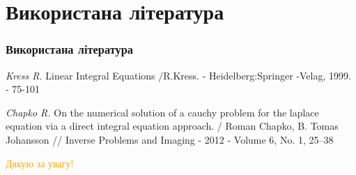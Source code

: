 \documentclass[10pt]{beamer}
\begin{document}
\section{Використана література}
\begin{frame}
\frametitle{Використана література}
\renewcommand{\bibname}{Список використаної літератури}
\begin{thebibliography}{99}

\emph{Kress R.} Linear Integral Equations /R.Kress. - Heidelberg:Springer -Velag, 1999. - 75-101

\emph{Chapko R.} On the numerical solution of a cauchy problem for the laplace equation via a direct integral equation approach. / Roman Chapko, B. Tomas Johansson // Inverse Problems and Imaging - 2012 - Volume 6, No. 1, 25–38
\end{thebibliography}

\end{frame}

\begin{frame}
\begin{center}
\Huge{\textcolor{orange}{Дякую за увагу!}}
\end{center}
\end{frame}
\end{document}
